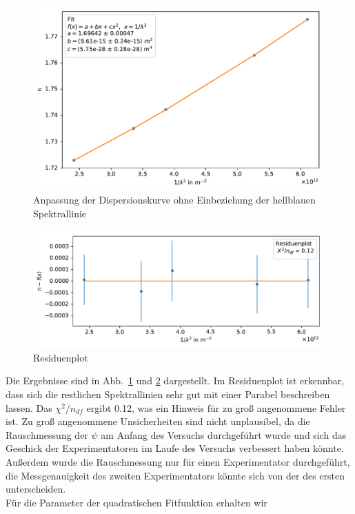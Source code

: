 \documentclass[12pt,a4paper]{article}
\begin{document}
\begin{figure}[H]
	\centering
	\includegraphics[width=0.95\linewidth]{Python/CdHg_Fit.pdf}
	\caption{Anpassung der Dispersionskurve ohne Einbeziehung der hellblauen Spektrallinie}
	\label{CdHg_LinReg}
\end{figure}
\begin{figure}[H]
	\centering
	\includegraphics[width=\linewidth]{Python/CdHg_Residuen.pdf}
	\caption{Residuenplot}
	\label{CdHg_Residuenplot}
\end{figure}
Die Ergebnisse sind in Abb.~\ref{CdHg_LinReg} und \ref{CdHg_Residuenplot} dargestellt. Im Residuenplot ist erkennbar, dass sich die restlichen Spektrallinien sehr gut mit einer Parabel beschreiben lassen. Das $\chi^2/n_{df}$ ergibt 0.12, was ein Hinweis für zu groß angenommene Fehler ist. Zu groß angenommene Unsicherheiten sind nicht unplausibel, da die Rauschmessung der $\psi$ am Anfang des Versuchs durchgeführt wurde und sich das Geschick der Experimentatoren im Laufe des Versuchs verbessert haben könnte. Außerdem wurde die Rauschmessung nur für einen Experimentator durchgeführt, die Messgenauigkeit des zweiten Experimentators könnte sich von der des ersten unterscheiden.\\
Für die Parameter der quadratischen Fitfunktion erhalten wir
\end{document}
